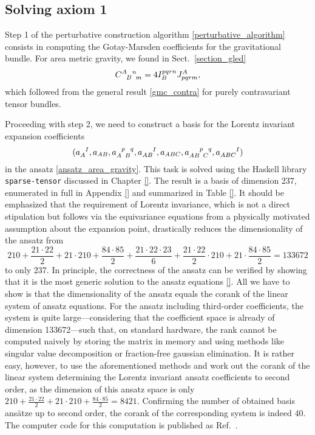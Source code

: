 \subsection{Solving axiom 1}\label{sect_area_lagrangian}
Step 1 of the perturbative construction algorithm \ref{perturbative_algorithm} consists in computing the Gotay-Marsden coefficients for the gravitational bundle. For area metric gravity, we found in Sect.~\ref{section_gled}
\begin{equation}
  \gmc{A}{B}{n}{m} = 4 I^{pqrn}_B J^A_{pqrm},
\end{equation}
which followed from the general result \eqref{gmc_contra} for purely contravariant tensor bundles.

Proceeding with step 2, we need to construct a basis for the Lorentz invariant expansion coefficients
\begin{equation}
  (a_A^{\hphantom AI}, a_{AB}, a_{A\hphantom pB}^{\hphantom Ap\hphantom Bq}, a_{AB}^{\hphantom{AB}I}, a_{ABC}, a_{AB\hphantom pC}^{\hphantom{AB}p\hphantom Cq}, a_{ABC}^{\hphantom{ABC}I})
\end{equation}
in the ansatz \eqref{ansatz_area_gravity}. This task is solved using the Haskell library \texttt{sparse-tensor} \cite{Reinhart_2019_sparse-tensor} discussed in Chapter \ref{}. The result is a basis of dimension 237, enumerated in full in Appendix \ref{} and summarized in Table \ref{}. It should be emphasized that the requirement of Lorentz invariance, which is not a direct stipulation but follows via the equivariance equations from a physically motivated assumption about the expansion point, drastically reduces the dimensionality of the ansatz from
\begin{equation}
  210 + \frac{21\cdot 22}{2} + 21\cdot 210 + \frac{84\cdot 85}{2} + \frac{21\cdot 22\cdot 23}{6} + \frac{21\cdot 22}{2} \cdot  210 + 21\cdot\frac{84\cdot 85}{2} = 133672
\end{equation}
to only 237. In principle, the correctness of the ansatz can be verified by showing that it is the most generic solution to the ansatz equations \ref{}. All we have to show is that the dimensionality of the ansatz equals the corank of the linear system of ansatz equations. For the ansatz including third-order coefficients, the system is quite large---considering that the coefficient space is already of dimension 133672---such that, on standard hardware, the rank cannot be computed naively by storing the matrix in memory and using methods like singular value decomposition or fraction-free gaussian elimination. It is rather easy, however, to use the aforementioned methods and work out the corank of the linear system determining the Lorentz invariant ansatz coefficients to second order, as the dimension of this ansatz space is only $210 + \frac{21\cdot 22}{2} + 21 \cdot 210 + \frac{84\cdot 85}{2} = 8421$. Confirming the number of obtained basis ansätze up to second order, the corank of the corresponding system is indeed 40. The computer code for this computation is published as Ref.~\cite{Alex_2020_area-metric-gravity}.
